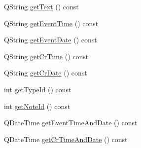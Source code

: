 \begin{DoxyCompactItemize}
Q\+String \hyperlink{class_matty_note_a27f706483d1ea9810edd6000325084cd}{get\+Text} () const 
\item 
Q\+String \hyperlink{class_matty_note_a62d645e90fcc6e7770998de4cece7d54}{get\+Event\+Time} () const 
\item 
Q\+String \hyperlink{class_matty_note_abc8ba0634009935b7961b03383975f8c}{get\+Event\+Date} () const 
\item 
Q\+String \hyperlink{class_matty_note_ac765ee87552c7cb8065ed30fd6775826}{get\+Cr\+Time} () const 
\item 
Q\+String \hyperlink{class_matty_note_a96b94f00d655bd3f6752165e5654f1cf}{get\+Cr\+Date} () const 
\item 
int \hyperlink{class_matty_note_a240b06385087407952b346661656e54d}{get\+Type\+Id} () const 
\item 
int \hyperlink{class_matty_note_a2b1efb653f4cf18ba2ed1dcbe0836fa9}{get\+Note\+Id} () const 
\item 
Q\+Date\+Time \hyperlink{class_matty_note_acbf9c79b1ed69751f8cd30afdd4b247e}{get\+Event\+Time\+And\+Date} () const 
\item 
Q\+Date\+Time \hyperlink{class_matty_note_a7e9fb3cdae76a5058ce6cc0df38c3daa}{get\+Cr\+Time\+And\+Date} () const 
\end{DoxyCompactItemize}
